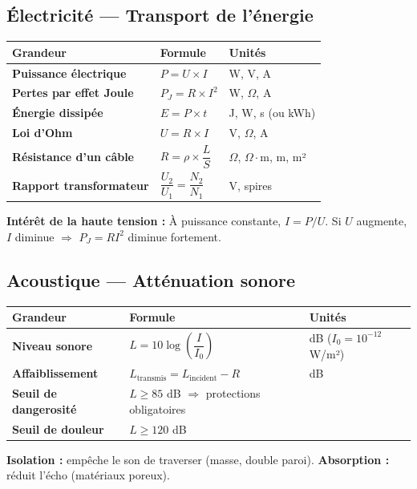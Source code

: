 \documentclass[a4paper,11pt]{article}
\begin{document}
\begin{formulairebox}

\subsection*{Électricité — Transport de l'énergie}

\begin{tabular}{>{\bfseries}p{4.5cm} p{5.5cm} p{4cm}}
\toprule
\textbf{Grandeur} & \textbf{Formule} & \textbf{Unités} \\
\midrule
Puissance électrique & $P = U \times I$ & W, V, A \\[4pt]
Pertes par effet Joule & $P_J = R \times I^2$ & W, $\Omega$, A \\[4pt]
Énergie dissipée & $E = P \times t$ & J, W, s \quad (ou kWh) \\[4pt]
Loi d'Ohm & $U = R \times I$ & V, $\Omega$, A \\[4pt]
Résistance d'un câble & $R = \rho \times \dfrac{L}{S}$ & $\Omega$, $\Omega\cdot$m, m, m² \\[6pt]
Rapport transformateur & $\dfrac{U_2}{U_1} = \dfrac{N_2}{N_1}$ & V, spires \\[6pt]
\bottomrule
\end{tabular}

\smallskip
\textbf{Intérêt de la haute tension :} À puissance constante, $I = P/U$. Si $U$ augmente, $I$ diminue $\Rightarrow$ $P_J = RI^2$ diminue fortement.

\subsection*{Acoustique — Atténuation sonore}

\begin{tabular}{>{\bfseries}p{4.5cm} p{5.5cm} p{4cm}}
\toprule
\textbf{Grandeur} & \textbf{Formule} & \textbf{Unités} \\
\midrule
Niveau sonore & $L = 10\log\!\left(\dfrac{I}{I_0}\right)$ & dB \quad ($I_0 = 10^{-12}$ W/m²) \\[6pt]
Affaiblissement & $L_{\text{transmis}} = L_{\text{incident}} - R$ & dB \\[4pt]
Seuil de dangerosité & $L \geq 85$ dB $\Rightarrow$ protections obligatoires & \\[4pt]
Seuil de douleur & $L \geq 120$ dB & \\[4pt]
\bottomrule
\end{tabular}

\smallskip
\textbf{Isolation :} empêche le son de traverser (masse, double paroi). \quad \textbf{Absorption :} réduit l'écho (matériaux poreux).

\end{formulairebox}
\end{document}
